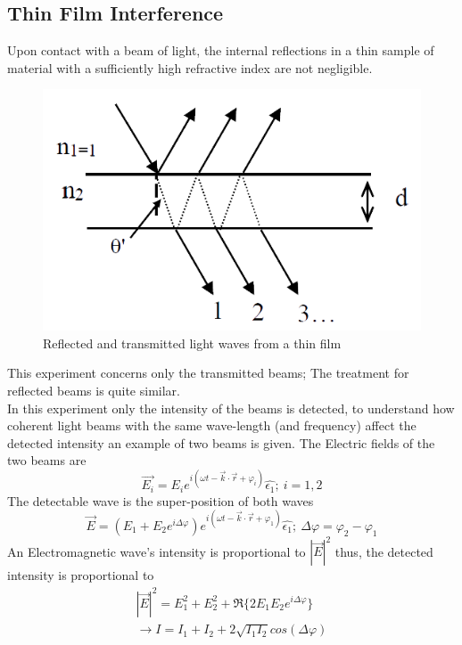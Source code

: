 \documentclass[reprint,amsmath,amssymb,aps, prl,superscriptaddress]{revtex4-2}
\begin{document}
\subsection{Thin Film Interference}
Upon contact with a beam of light, the internal reflections in a thin sample of material with a sufficiently high refractive index are not negligible.
\begin{figure}[H]
    \includegraphics[width=\linewidth]{Images/Thin film.png}
    \caption{Reflected and transmitted light waves from a thin film}
    \label{fig:ThinFilm}
\end{figure}
This experiment concerns only the transmitted beams; The treatment for reflected beams is quite similar.\\
In this experiment only the intensity of the beams is detected, to understand how coherent light beams with the same wave-length (and frequency) affect the detected intensity an example of two beams is given. 
The Electric fields of the two beams are
\begin{equation*}
    \vec{E_{i}}=E_{i}e^{i(\omega t - \vec{k}\cdot\vec{r} + \varphi_i)}\hat{\epsilon_1};\ i=1,2
\end{equation*}
The detectable wave is the super-position of both waves
\begin{equation*}
    \vec{E} = (E_{1}+E_{2}e^{i\Delta\varphi})e^{i(\omega t - \vec{k}\cdot\vec{r} + \varphi_1)}\hat{\epsilon_1};\ \Delta\varphi=\varphi_2-\varphi_1
\end{equation*}
An Electromagnetic wave's intensity is proportional to $|\vec{E}|^2$ thus, the detected intensity is proportional to 
\begin{equation*}
\begin{split}
    |\vec{E}|^2 = E_{1}^2 + E_2^2 + \Re\{2E_{1}E_{2}e^{i\Delta\varphi}\}\\ \rightarrow I=I_1+I_2+2\sqrt{I_1I_2}cos(\Delta\varphi)
\end{split}
\end{equation*}
\end{document}
